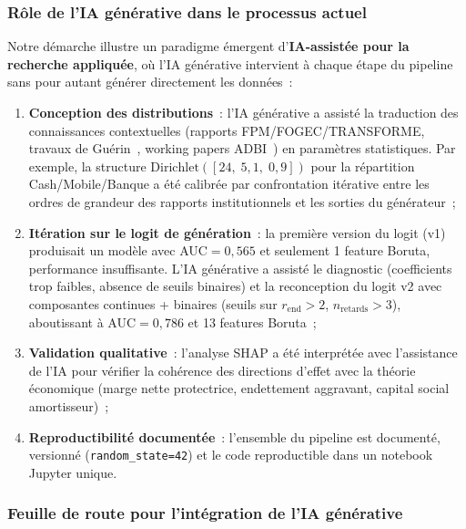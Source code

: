 \documentclass[12pt, a4paper, twocolumn]{article}
\begin{document}
\subsubsection{Rôle de l'IA générative dans le processus actuel}
\label{subsubsec:role_ia}

Notre démarche illustre un paradigme émergent d'\textbf{IA-assistée pour la recherche appliquée}, où l'IA générative intervient à chaque étape du pipeline sans pour autant générer directement les données~:

\begin{enumerate}[leftmargin=*]
  \item \textbf{Conception des distributions}~: l'IA générative a assisté la traduction des connaissances contextuelles (rapports FPM/FOGEC/TRANSFORME, travaux de Guérin~\cite{guerin2015}, working papers ADBI~\cite{nguyen2020}) en paramètres statistiques. Par exemple, la structure $\text{Dirichlet}([24,\;5{,}1,\;0{,}9])$ pour la répartition Cash/Mobile/Banque a été calibrée par confrontation itérative entre les ordres de grandeur des rapports institutionnels et les sorties du générateur~;

  \item \textbf{Itération sur le logit de génération}~: la première version du logit (v1) produisait un modèle avec AUC${}=0{,}565$ et seulement 1 feature Boruta, performance insuffisante. L'IA générative a assisté le diagnostic (coefficients trop faibles, absence de seuils binaires) et la reconception du logit v2 avec composantes continues + binaires (seuils sur $r_{\text{end}} > 2$, $n_{\text{retards}} > 3$), aboutissant à AUC${}=0{,}786$ et 13 features Boruta~;

  \item \textbf{Validation qualitative}~: l'analyse SHAP a été interprétée avec l'assistance de l'IA pour vérifier la cohérence des directions d'effet avec la théorie économique (marge nette protectrice, endettement aggravant, capital social amortisseur)~;

  \item \textbf{Reproductibilité documentée}~: l'ensemble du pipeline est documenté, versionné (\texttt{random\_state=42}) et le code reproductible dans un notebook Jupyter unique.
\end{enumerate}

\subsubsection{Feuille de route pour l'intégration de l'IA générative}
\label{subsubsec:roadmap_ia}
\end{document}

